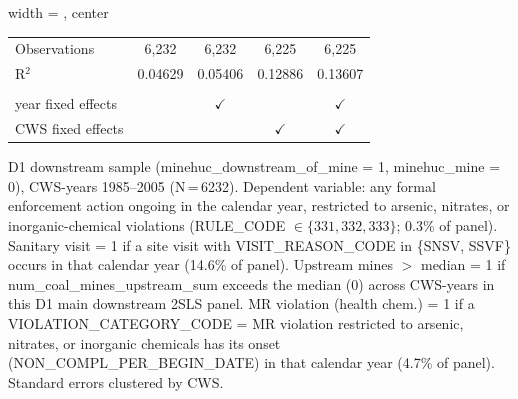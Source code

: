 \begin{table}[htbp]
\begin{adjustbox}{width = \textwidth, center}
\begin{tabular}{lcccc}
         Observations                & 6,232          & 6,232          & 6,225          & 6,225\\  
         R$^2$                       & 0.04629        & 0.05406        & 0.12886        & 0.13607\\  
         
          \\
         
         year fixed effects          &                & $\checkmark$   &                & $\checkmark$\\   
         CWS fixed effects           &                &                & $\checkmark$   & $\checkmark$\\   
         
         \bottomrule
         
      \end{tabular}
      
      
      
   \end{adjustbox}
      {\tiny\linespread{1}\selectfont \par \raggedright 
   D1 downstream sample (minehuc\_downstream\_of\_mine = 1, minehuc\_mine = 0), CWS-years 1985--2005 (N\,=\,6232). Dependent variable: any formal enforcement action ongoing in the calendar year, restricted to arsenic, nitrates, or inorganic-chemical violations (RULE\_CODE $\in\{331,332,333\}$; 0.3\% of panel). Sanitary visit = 1 if a site visit with VISIT\_REASON\_CODE in \{SNSV, SSVF\} occurs in that calendar year (14.6\% of panel). Upstream mines $>$ median = 1 if num\_coal\_mines\_upstream\_sum exceeds the median (0) across CWS-years in this D1 main downstream 2SLS panel. MR violation (health chem.) = 1 if a VIOLATION\_CATEGORY\_CODE = MR violation restricted to arsenic, nitrates, or inorganic chemicals has its onset (NON\_COMPL\_PER\_BEGIN\_DATE) in that calendar year (4.7\% of panel). Standard errors clustered by CWS.}
   
\end{table}



